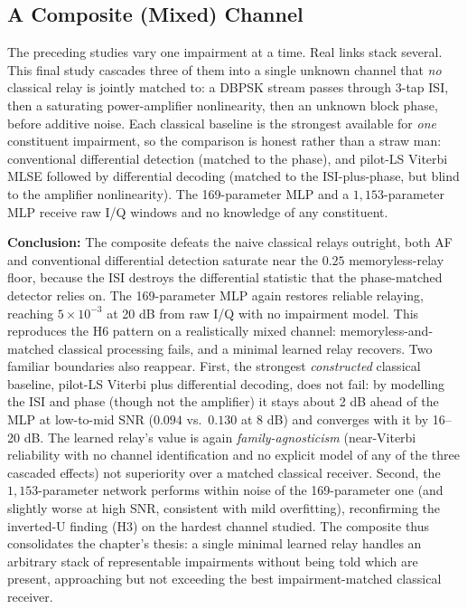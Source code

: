 \subsection{A Composite (Mixed) Channel}\label{sec:composite-channel}

The preceding studies vary one impairment at a time. Real links stack several. This final study cascades three of them into a single unknown channel that \emph{no} classical relay is jointly matched to: a DBPSK stream passes through 3-tap ISI, then a saturating power-amplifier nonlinearity, then an unknown block phase, before additive noise. Each classical baseline is the strongest available for \emph{one} constituent impairment, so the comparison is honest rather than a straw man: conventional differential detection (matched to the phase), and pilot-LS Viterbi MLSE followed by differential decoding (matched to the ISI-plus-phase, but blind to the amplifier nonlinearity). The 169-parameter MLP and a $1{,}153$-parameter MLP receive raw I/Q windows and no knowledge of any constituent.

\textbf{Conclusion:} The composite defeats the naive classical relays outright, both AF and conventional differential detection saturate near the $0.25$ memoryless-relay floor, because the ISI destroys the differential statistic that the phase-matched detector relies on. The 169-parameter MLP again restores reliable relaying, reaching $5\times10^{-3}$ at 20 dB from raw I/Q with no impairment model. This reproduces the H6 pattern on a realistically mixed channel: memoryless-and-matched classical processing fails, and a minimal learned relay recovers. Two familiar boundaries also reappear. First, the strongest \emph{constructed} classical baseline, pilot-LS Viterbi plus differential decoding, does not fail: by modelling the ISI and phase (though not the amplifier) it stays about 2 dB ahead of the MLP at low-to-mid SNR ($0.094$ vs.\ $0.130$ at 8 dB) and converges with it by 16--20 dB. The learned relay's value is again \emph{family-agnosticism} (near-Viterbi reliability with no channel identification and no explicit model of any of the three cascaded effects) not superiority over a matched classical receiver. Second, the $1{,}153$-parameter network performs within noise of the 169-parameter one (and slightly worse at high SNR, consistent with mild overfitting), reconfirming the inverted-U finding (H3) on the hardest channel studied. The composite thus consolidates the chapter's thesis: a single minimal learned relay handles an arbitrary stack of representable impairments without being told which are present, approaching but not exceeding the best impairment-matched classical receiver.

